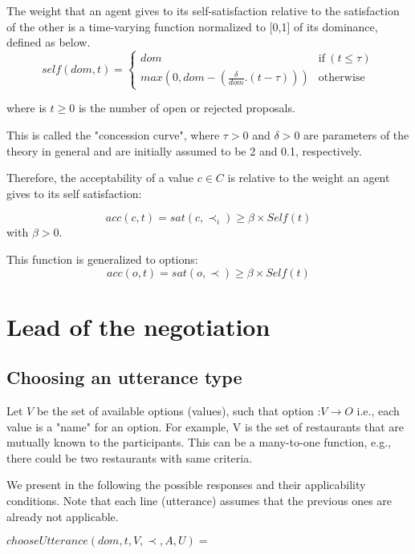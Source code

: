 \documentclass{article}
\begin{document}
	The weight that an agent gives to its self-satisfaction relative to	the satisfaction of the other is a time-varying function normalized to 	[0,1] of its dominance, defined as below.
		$$self(dom, t) = \left\{\begin{array}{ll}
		dom & \mathrm{if\ } (t \leq \tau)\\
		max(0, dom - (\frac{\delta}{dom} . (t - \tau))) & \mathrm{otherwise}
		\end{array}\right.$$
		
	
	where is $t \geq 0$ is the number of open or rejected proposals.
	
	This is called the "concession curve", where $\tau > 0$ and $\delta > 0$
	are parameters of the theory in general and are initially assumed to
	be 2 and 0.1, respectively.
	
	Therefore, the acceptability of a value $c \in C$  is relative to the weight an agent gives to its self satisfaction:
	
	 $$acc(c, t) = sat(c, \prec_i) \geq  \beta \times Self(t)$$
	 with $\beta > 0 $.
	 
	 This function is generalized to options:
	  $$acc(o, t) = sat(o, \prec) \geq  \beta \times Self(t)$$
	 
	
	\section{Lead of the negotiation}

	
	\subsection{Choosing an utterance type}
		Let $V$ be the set of available options (values), such that option :$ V\rightarrow O$	i.e., each value is a "name" for an option.  For example, V is the set of restaurants that are mutually known to the participants. This can be a many-to-one function, e.g., there could be two restaurants with same criteria.		
		
		We present in the following the possible responses and their applicability conditions. Note that each line (utterance)  assumes that the previous ones are already not applicable.
	
	$ chooseUtterance(dom, t, V, \prec, A, U) = $ \\
	
\end{document}
